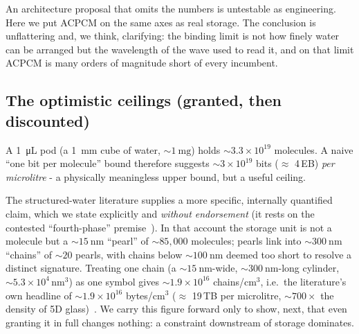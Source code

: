 \documentclass[11pt]{article}
\theoremstyle{definition}
\begin{document}
An architecture proposal that omits the numbers is untestable as engineering. Here we put
ACPCM on the same axes as real storage. The conclusion is unflattering and, we think,
clarifying: the binding limit is not how finely water can be arranged but the wavelength of
the wave used to read it, and on that limit ACPCM is many orders of magnitude short of every
incumbent.

\subsection{The optimistic ceilings (granted, then discounted)}
A \qty{1}{\micro\liter} pod (a \qty{1}{\milli\meter} cube of water, ${\sim}\qty{1}{\milli\gram}$)
holds ${\sim}3.3\times10^{19}$ molecules. A naive ``one bit per molecule'' bound therefore
suggests ${\sim}3\times10^{19}$ bits ($\approx$ 4\,EB) \emph{per microlitre} - a physically
meaningless upper bound, but a useful ceiling.

The structured-water literature supplies a more specific, internally quantified claim, which
we state explicitly and \emph{without endorsement} (it rests on the contested ``fourth-phase''
premise~\cite{pollack2013fourth,elton2020ez}). In that account the storage unit is not a
molecule but a ${\sim}\qty{15}{\nano\meter}$ ``pearl'' of ${\sim}85{,}000$ molecules; pearls
link into ${\sim}\qty{300}{\nano\meter}$ ``chains'' of ${\sim}20$ pearls, with chains below
${\sim}\qty{100}{\nano\meter}$ deemed too short to resolve a distinct signature. Treating one
chain (a ${\sim}\qty{15}{\nano\meter}$-wide, ${\sim}\qty{300}{\nano\meter}$-long cylinder,
${\sim}5.3\times10^{4}\,\mathrm{nm}^3$) as one symbol gives ${\sim}1.9\times10^{16}$
chains/cm$^3$, i.e.\ the literature's own headline of ${\sim}1.9\times10^{16}$ bytes/cm$^3$
($\approx$ 19\,TB per microlitre, ${\sim}700\times$ the density of 5D
glass)~\cite{pollack2013fourth}. We carry this figure forward only to show, next, that even
granting it in full changes nothing: a constraint downstream of storage dominates.
\end{document}
